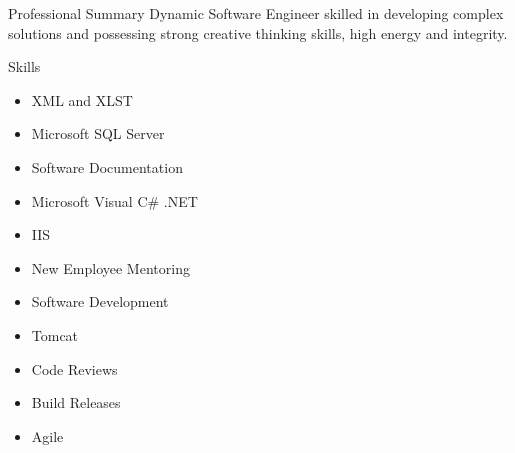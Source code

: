 \documentclass{resume} %
\begin{document}

\begin{rSection}{Professional Summary} 
Dynamic Software Engineer skilled in developing complex solutions and possessing strong creative thinking skills, high energy and integrity.
\end{rSection}


\begin{rSection}{Skills}
\begin{multicols}{2}
\begin{enumerate}
\begin{itemize}
\item XML and XLST
\item Microsoft SQL Server
\item Software Documentation
\item Microsoft Visual C\# .NET
\item IIS
\item New Employee Mentoring
\item Software Development
\item Tomcat
\item Code Reviews
\item Build Releases
\item Agile
\end{itemize}
\end{enumerate}
\end{multicols}
\end{rSection}

\end{document}
